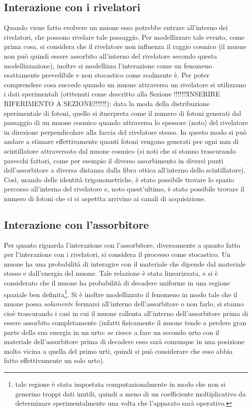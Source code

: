 \subsection{Interazione con i rivelatori}
Quando viene fatto evolvere un muone esso potrebbe entrare all'interno dei rivelatori, che possono rivelare tale passaggio. Per modellizzare tale evento, come prima cosa,
si considera che il rivelatore non influenza il raggio cosmico (il muone non può quindi essere assorbito all'interno del rivelatore secondo questa modellizzazione), inoltre
si modellizza l'interazione come un fenomeno esattamente prevedibile e non stocastico come realmente è. Per poter comprendere cosa succede quando un muone attraversa
un rivelatore si utilizzano i dati sperimentali (otttenuti come descritto alla Sezione !!!!!!!INSERIRE RIFERIMENTO A SEZIONE!!!!!!!): data la moda della distribuzione
sperimentale di fotoni, quello si itnerpreta come il numero di fotoni generati dal passaggio di un muone cosmico quando attraversa lo spessore (noto) del rivelatore
in direzione perpendicolare alla faccia del rivelatore stesso. In questo modo si può andare a stimare effettivamente quanti fotoni vengono generati per ogni mm 
di scintillatore attraversato dal muone cosmico (si noti che si stanno trascurando parecchi fattori, come per esempio il diverso assorbimento in diversi punti dell'assorbitore
a diversa distanza dalla fibra ottica all'interno dello scintillatore). Così, usando delle identità trigonometriche, è stato possibile trovare lo spazio percorso
all'interno del rivelatore e, noto quest'ultimo, è stato possibile trovare il numero di fotoni che ci si aspettta arrivino ai canali di acquisizione.

\subsection{Interazione con l'assorbitore}
Per quanto riguarda l'interazione con l'assorbitore, diversamente a quanto fatto per l'interazione con i rivelatori, si considera il processo come stocastico. Un muone
ha una probabilità di interagire con il materiale che dipende dal materiale stesso e dall'energia del muone. Tale relazione è stata linearizzata, e si è considerato che il
muone ha probabilità di decadere uniforme in una regione spaziale ben definita\footnote{tale regione è stata impostata computazionalmente in modo che non si generino troppi
dati inutili, quindi a meno di un coefficiente moltiplicativo da determinare sperimentalmente una volta che l'apparato sarà operativo.}. Si è inoltre modellizzato il fenomeno
in modo tale che il muone possa \textit{solamente} fermarsi all'interno dell'assorbitore o non farlo, si stanno cioè trascurando i casi in cui il muone rallenta
all'interno dell'assorbitore prima di essere assorbito completamente (infatti fisicamente il muone tende a perdere gran parte della sua energia in un urto: se riesce
a fare un secondo urto con il materiale dell'assorbitore prima di decadere esso sarà comunque in una posizione molto vicina a quella del primo urti, quindi si può
considerare che esso abbia fatto effettivamente un solo urto).

